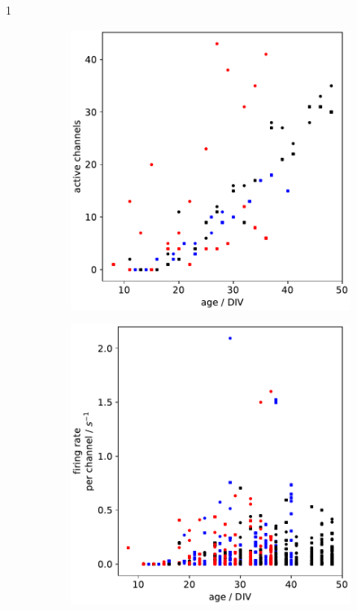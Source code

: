 1\documentclass[11pt]{article}
\begin{document}
{\begin{figure}
\begin{subfigure}[b]{0.45\textwidth}
	\centering
	\includegraphics[width=\textwidth]{../plots/development_plots_channels.pdf}
\end{subfigure}
\hfill
\begin{subfigure}[b]{0.45\textwidth}
	\centering
	\includegraphics[width=\textwidth]{../plots/development_plots_fr_perchan.pdf}
\end{subfigure}


\end{figure}}
\end{document}
